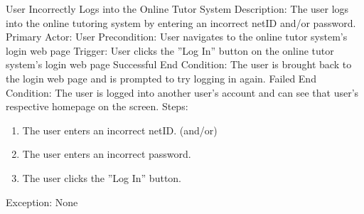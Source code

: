     \begin{section}{User Incorrectly Logs into the Online Tutor System}
        Description: The user logs into the online tutoring system by entering an incorrect netID and/or password. \newline
        Primary Actor: User \newline
        Precondition: User navigates to the online tutor system's login web page \newline
        Trigger: User clicks the ''Log In'' button on the online tutor system's login web page \newline
        Successful End Condition: The user is brought back to the login web page and is prompted to try logging in again. \newline
        Failed End Condition: The user is logged into another user's account and can see that user's respective homepage on the screen. \newline
        \newline
        Steps:
        \begin{enumerate}
            \item{The user enters an incorrect netID. \newline
	              (and/or)}
            \item{The user enters an incorrect password.}
            \item{The user clicks the ''Log In'' button.}
        \end{enumerate}
        Exception: None
    \end{section}
    
